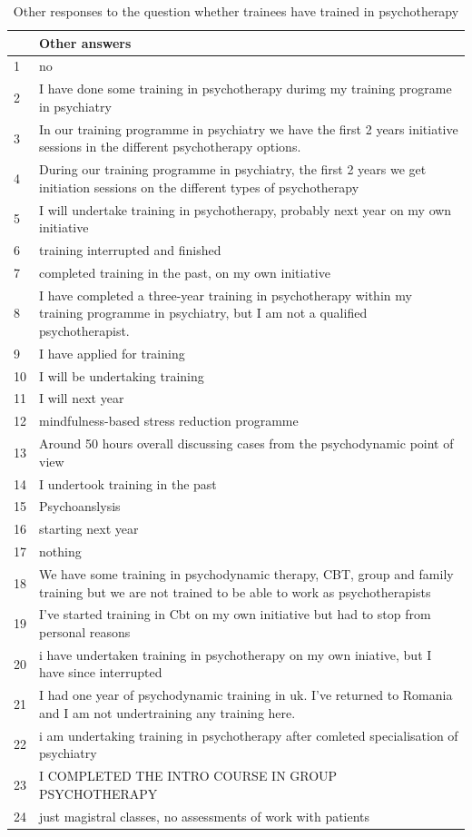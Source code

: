 \documentclass[]{tufte-handout}
\begin{document}
\newpage

\begin{table}[!t]
\centering
\begin{tabular}{lp{4in}}
  \toprule
 & Other answers \\ 
  \midrule
1 & no \\ 
  2 & I have done some training in psychotherapy durimg my training programe in psychiatry \\ 
  3 & In our training programme in psychiatry we have the first 2 years initiative sessions in the different psychotherapy options. \\ 
  4 & During our training programme in psychiatry, the first 2 years we get initiation sessions on the different types of psychotherapy \\ 
  5 & I will undertake training in psychotherapy, probably next year on my own initiative \\ 
  6 & training interrupted and finished \\ 
  7 & completed training in the past, on my own initiative \\ 
  8 & I have completed a three-year training in psychotherapy within my training programme in psychiatry, but I am not a qualified psychotherapist. \\ 
  9 & I have applied for training \\ 
  10 & I will be undertaking training \\ 
  11 & I will next year \\ 
  12 & mindfulness-based stress reduction programme \\ 
  13 & Around 50 hours overall discussing cases from the psychodynamic point of view \\ 
  14 & I undertook training in the past \\ 
  15 & Psychoanslysis \\ 
  16 & starting next year \\ 
  17 & nothing \\ 
  18 & We have some training in psychodynamic therapy, CBT, group and family training but we are not trained to be able to work as psychotherapists \\ 
  19 & I've started training in Cbt on my own initiative but had to stop from personal reasons \\ 
  20 & i have undertaken training in psychotherapy on my own iniative, but I have since interrupted \\ 
  21 & I had one year of psychodynamic training in uk. I've returned to Romania and I am not undertraining any training here. \\ 
  22 & i am undertaking training in psychotherapy after comleted specialisation of psychiatry \\ 
  23 & I COMPLETED THE INTRO COURSE IN GROUP PSYCHOTHERAPY \\ 
  24 & just magistral classes, no assessments of work with patients \\ 
   \bottomrule
\end{tabular}
\caption{Other responses to the question whether trainees have trained in psychotherapy} 
\end{table}
\end{document}
